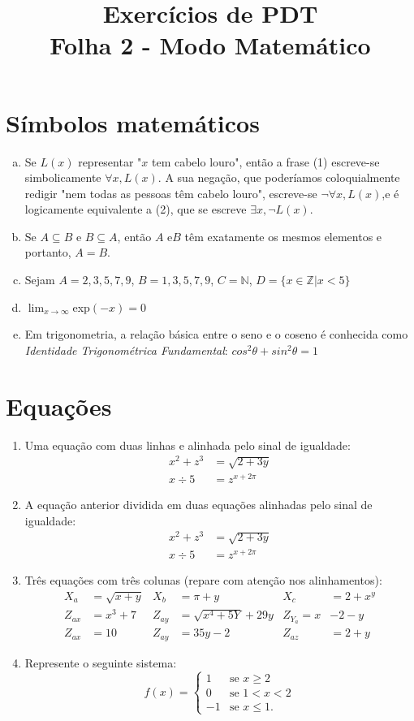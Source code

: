 \documentclass[12pt,a4paper]{article}
\title{Exercícios de PDT\\Folha 2 - Modo Matemático}
\date{}
\begin{document}
\maketitle
\section{Símbolos matemáticos}
\begin{enumerate}[(a)]
\item Se $L(x)$ representar "$x$ tem cabelo louro", então a frase (1) escreve-se simbolicamente $\forall x, L(x)$. A sua negação, que poderíamos coloquialmente redigir "nem todas as pessoas têm cabelo louro", escreve-se $\neg \forall x, L(x)$,e é logicamente equivalente a (2), que se escreve $\exists x, \neg L(x)$.
\item Se $A \subseteq B$ e $B \subseteq A$, então $A$ e$B$ têm exatamente os mesmos elementos e portanto, $A=B$.
\item Sejam $A = 2,3,5,7,9$, $B=1,3,5,7,9$, $C=\mathbb{N}$, $D=\{x\in \mathbb{Z}|x<5\}$
\item $\displaystyle \lim_{x \to \infty}$exp$(-x)=0$
\item Em trigonometria, a relação básica entre o seno e o coseno é conhecida como \textit{Identidade Trigonométrica Fundamental}: $cos^2 \theta +sin^2 \theta =1$
\end{enumerate}
\section{Equações}
\begin{enumerate}
\item Uma equação com duas linhas e alinhada pelo sinal de igualdade:
\begin{equation}
\begin{split}
x^2+z^3&=\sqrt{2+3y}\\
x\div 5&=z^{x+2\pi}
\end{split}
\end{equation}
\item  A equação anterior dividida em duas equações alinhadas pelo sinal de igualdade:
\begin{align}
x^2+z^3&=\sqrt{2+3y}\\
x\div 5&=z^{x+2\pi}
\end{align}
\item Três equações com três colunas (repare com atenção nos alinhamentos):
\begin{align}
X_{a}&=\sqrt{x+y} & X_{b}&=\pi +y & X_{c}&=2+x^y\\
Z_{ax}&=x^3+7 & Z_{ay}&=\sqrt{x^4+5Y}+29y & Z_{Y_{a}}=x&-2-y\\
Z_{ax}&=10 & Z_{ay}&=35y-2 & Z_{az}&=2+y
\end{align}
\item Represente o seguinte sistema:
\begin{equation}
f(x)=
\begin{cases}
1 & \text{se } x\geq 2\\
0 & \text{se } 1<x<2\\
-1 & \text{se } x\leq 1.
\end{cases}
\end{equation}
\end{enumerate}
\end{document}
